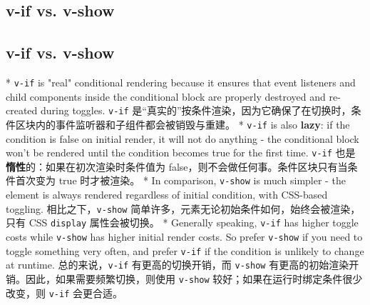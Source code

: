 \begin{paracol}{2}
\subsection{v-if vs. v-show}
\switchcolumn
\subsection{v-if vs. v-show}
\switchcolumn[0]*%
\texttt{v-if} is "real" conditional rendering because it ensures that
event listeners and child components inside the conditional block are
properly destroyed and re-created during toggles.
\switchcolumn
\texttt{v-if}
是``真实的''按条件渲染，因为它确保了在切换时，条件区块内的事件监听器和子组件都会被销毁与重建。
\switchcolumn[0]*%
\texttt{v-if} is also \textbf{lazy}: if the condition is false on
initial render, it will not do anything - the conditional block won't be
rendered until the condition becomes true for the first time.
\switchcolumn
\texttt{v-if} 也是\textbf{惰性}的：如果在初次渲染时条件值为
false，则不会做任何事。条件区块只有当条件首次变为 true 时才被渲染。
\switchcolumn[0]*%
In comparison, \texttt{v-show} is much simpler - the element is always
rendered regardless of initial condition, with CSS-based toggling.
\switchcolumn
相比之下，\texttt{v-show}
简单许多，元素无论初始条件如何，始终会被渲染，只有 CSS \texttt{display}
属性会被切换。
\switchcolumn[0]*%
Generally speaking, \texttt{v-if} has higher toggle costs while
\texttt{v-show} has higher initial render costs. So prefer
\texttt{v-show} if you need to toggle something very often, and prefer
\texttt{v-if} if the condition is unlikely to change at runtime.
\switchcolumn
总的来说，\texttt{v-if} 有更高的切换开销，而 \texttt{v-show}
有更高的初始渲染开销。因此，如果需要频繁切换，则使用 \texttt{v-show}
较好；如果在运行时绑定条件很少改变，则 \texttt{v-if} 会更合适。


\end{paracol}

